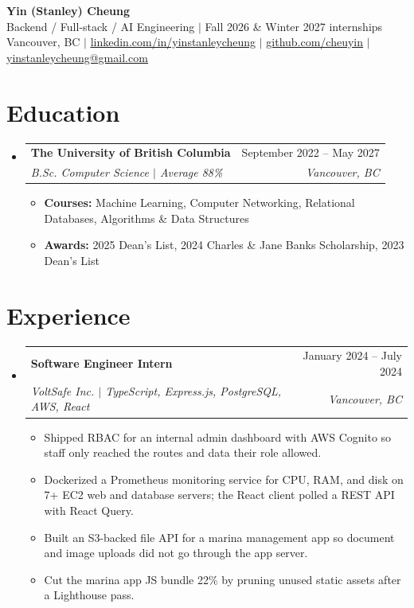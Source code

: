 \documentclass[letterpaper,11pt]{article}
\makeatletter
\newcommand{\resumeItem}[1]{
  \item\small{#1}
}
\newcommand{\resumeSubheading}[4]{
  \item
    \begin{tabular*}{0.97\textwidth}[t]{p{0.64\textwidth}@{\extracolsep{\fill}}r}
      \textbf{#1} & #2 \\
      \textit{\small#3} & \textit{\small #4} \\
    \end{tabular*}
}
\newcommand{\resumeSubHeadingListStart}{\begin{itemize}[leftmargin=0.15in, label={}, itemsep=5pt, parsep=0pt, topsep=2pt]}
\newcommand{\resumeSubHeadingListEnd}{\end{itemize}}
\newcommand{\resumeItemListStart}{\begin{itemize}[itemsep=2.5pt, parsep=0pt, topsep=2pt, leftmargin=0.15in]}
\newcommand{\resumeItemListEnd}{\end{itemize}}
\makeatother
\begin{document}
\begin{center}
    {\color{NavyBlue}\textbf{\huge Yin (Stanley) Cheung}} \\
    \vspace{6pt}
    {\small Backend / Full-stack / AI Engineering $|$ Fall 2026 \& Winter 2027 internships} \\
    \vspace{6pt}
    Vancouver, BC $|$
    \href{https://www.linkedin.com/in/yinstanleycheung}{\underline{linkedin.com/in/yinstanleycheung}} $|$
    \href{https://github.com/cheuyin}{\underline{github.com/cheuyin}} $|$
    \href{mailto:yinstanleycheung@gmail.com}{\underline{yinstanleycheung@gmail.com}}
\end{center}

\section{Education}
  \resumeSubHeadingListStart
    \resumeSubheading
      {The University of British Columbia}{September 2022 -- May 2027}
      {B.Sc. Computer Science $|$ Average 88\%}{Vancouver, BC}
      \resumeItemListStart
        \resumeItem{\textbf{Courses:} Machine Learning, Computer Networking, Relational Databases, Algorithms \& Data Structures}
        \resumeItem{\textbf{Awards:} 2025 Dean's List, 2024 Charles \& Jane Banks Scholarship, 2023 Dean's List}
      \resumeItemListEnd
  \resumeSubHeadingListEnd

\section{Experience}
  \resumeSubHeadingListStart
    \resumeSubheading
      {Software Engineer Intern}{January 2024 -- July 2024}
      {VoltSafe Inc. $|$ TypeScript, Express.js, PostgreSQL, AWS, React}{Vancouver, BC}
        \resumeItemListStart
          \resumeItem{Shipped RBAC for an internal admin dashboard with AWS Cognito so staff only reached the routes and data their role allowed.}
          \resumeItem{Dockerized a Prometheus monitoring service for CPU, RAM, and disk on 7+ EC2 web and database servers; the React client polled a REST API with React Query.}
          \resumeItem{Built an S3-backed file API for a marina management app so document and image uploads did not go through the app server.}
          \resumeItem{Cut the marina app JS bundle 22\% by pruning unused static assets after a Lighthouse pass.}
        \resumeItemListEnd
  \resumeSubHeadingListEnd
\end{document}

